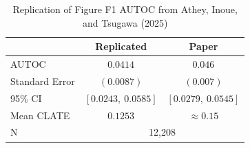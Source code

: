 \begin{table}[h]
\centering
\caption{Replication of Figure F1 AUTOC from Athey, Inoue, and Tsugawa (2025)}
\begin{tabular}{lcc}
\toprule
 & Replicated & Paper \\
\midrule
AUTOC & $0.0414$ & $0.046$ \\
Standard Error & $(0.0087)$ & $(0.007)$ \\
95\% CI & $[0.0243,\ 0.0585]$ & $[0.0279,\ 0.0545]$ \\
Mean CLATE & $0.1253$ & $\approx 0.15$ \\
N & \multicolumn{2}{c}{12,208} \\
\bottomrule
\end{tabular}
\label{tab:main}
\end{table}
